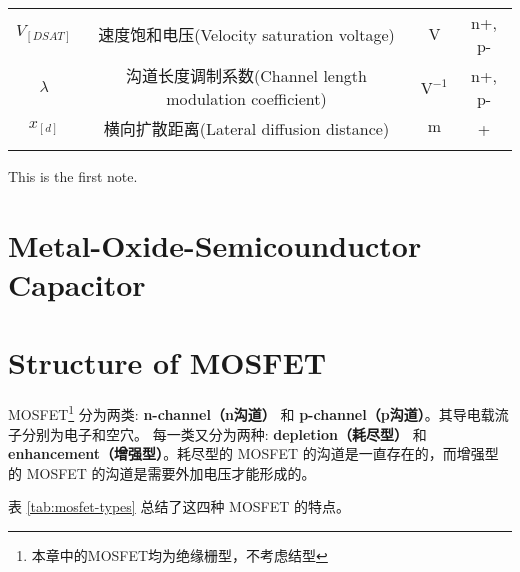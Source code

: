 \begin{table}[!htb]
\begin{NiceTabular}{cccc}
        $V_[DSAT]$ & 速度饱和电压(Velocity saturation voltage) & $\unit{\volt}$ & n+, p- \\
        $\lambda$ & 沟道长度调制系数(Channel length modulation coefficient) & $\unit{\volt \tothe{-1}}$ & n+, p- \\
        $x_[d]$ & 横向扩散距离(Lateral diffusion distance) & $\unit{\meter}$ & + \\
        \Xhline{1pt}
    \end{NiceTabular}
    \begin{tablenotes}
        \item This is the first note.
    \end{tablenotes}
\end{table}

\section[MOS]{Metal-Oxide-Semicounductor Capacitor}

\section{Structure of MOSFET}

MOSFET\footnote{本章中的MOSFET均为绝缘栅型，不考虑结型} 分为两类: \textbf{n-channel（n沟道）} 和 \textbf{p-channel（p沟道）}。其导电载流子分别为电子和空穴。
每一类又分为两种: \textbf{depletion（耗尽型）} 和 \textbf{enhancement（增强型）}。耗尽型的 MOSFET 的沟道是一直存在的，而增强型的 MOSFET 的沟道是需要外加电压才能形成的。

表 \ref{tab:mosfet-types} 总结了这四种 MOSFET 的特点。

